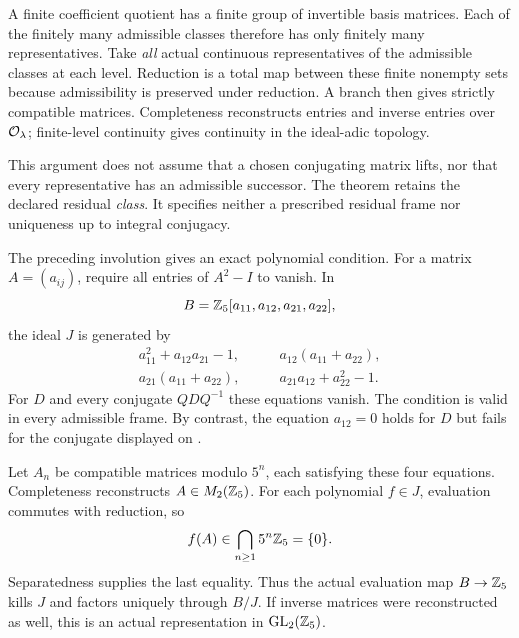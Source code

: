 A finite coefficient quotient has a finite group of invertible basis matrices. Each of the finitely many admissible classes therefore has only finitely many representatives. Take \emph{all} actual continuous representatives of the admissible classes at each level. Reduction is a total map between these finite nonempty sets because admissibility is preserved under reduction. A branch then gives strictly compatible matrices. Completeness reconstructs entries and inverse entries over $\mathcal O_\lambda$; finite-level continuity gives continuity in the ideal-adic topology.

This argument does not assume that a chosen conjugating matrix lifts, nor that every representative has an admissible successor. The theorem retains the declared residual \emph{class}. It specifies neither a prescribed residual frame nor uniqueness up to integral conjugacy.


The preceding involution gives an exact polynomial condition. For a matrix $A=(a_{ij})$, require all entries of $A^2-I$ to vanish. In
\[
B=\mathbb Z_5[a_{11},a_{12},a_{21},a_{22}],
\]
the ideal $J$ is generated by
\[
\begin{aligned}
a_{11}^2+a_{12}a_{21}-1,&\qquad a_{12}(a_{11}+a_{22}),\\
a_{21}(a_{11}+a_{22}),&\qquad a_{21}a_{12}+a_{22}^2-1.
\end{aligned}
\]
For $D$ and every conjugate $QDQ^{-1}$ these equations vanish. The condition is valid in every admissible frame. By contrast, the equation $a_{12}=0$ holds for $D$ but fails for the conjugate displayed on .

Let $A_n$ be compatible matrices modulo $5^n$, each satisfying these four equations. Completeness reconstructs $A\in M_2(\mathbb Z_5)$. For each polynomial $f\in J$, evaluation commutes with reduction, so
\[
f(A)\in\bigcap_{n\ge1}5^n\mathbb Z_5=\{0\}.
\]
Separatedness supplies the last equality. Thus the actual evaluation map $B\to\mathbb Z_5$ kills $J$ and factors uniquely through $B/J$. If inverse matrices were reconstructed as well, this is an actual representation in $\operatorname{GL}_2(\mathbb Z_5)$.


